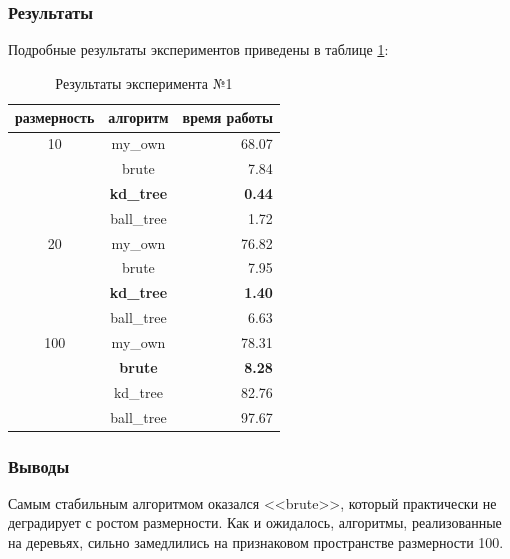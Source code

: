 \documentclass[a4paper, 11pt]{article}
\begin{document}
    \subsubsection{Результаты}
    Подробные результаты экспериментов приведены в таблице \ref{exp1:table}:
    \\
        \begin{table}[h]
            \begin{center}
                \caption{Результаты эксперимента №1} \label{exp1:table}
                \begin{tabular}{|c|c|r|} 
                    \hline 
                    размерность & алгоритм & время работы \\ 
                    \hline
                    10 & my\_own & 68.07 \\ 
                    \cline{2-3} 
                    & brute & 7.84 \\ 
                    \cline{2-3} 
                    & \textbf{kd\_tree} & \textbf{0.44} \\ 
                    \cline{2-3} 
                    & ball\_tree & 1.72 \\ 
                    \cline{2-3} 
                    \hline 
                    20 & my\_own & 76.82 \\ 
                    \cline{2-3}  
                    & brute & 7.95 \\ 
                    \cline{2-3}  
                    & \textbf{kd\_tree} & \textbf{1.40} \\ 
                    \cline{2-3} 
                    & ball\_tree & 6.63 \\ 
                    \hline 
                    100 & my\_own & 78.31 \\ 
                    \cline{2-3}  
                    & \textbf{brute} & \textbf{8.28} \\ 
                    \cline{2-3} 
                    & kd\_tree & 82.76 \\ 
                    \cline{2-3}
                    & ball\_tree & 97.67 \\
                    \hline
                \end{tabular} 
            \end{center}
        \end{table}
    \subsubsection{Выводы}
    Самым стабильным алгоритмом оказался <<brute>>, который практически не деградирует с ростом размерности. Как и ожидалось, алгоритмы, реализованные на деревьях, сильно замедлились на признаковом пространстве размерности 100.
    
\end{document}
